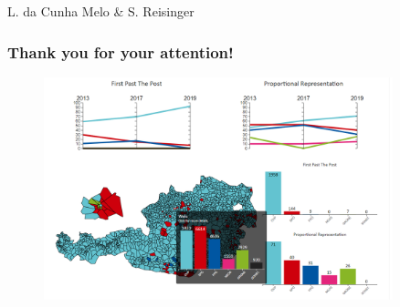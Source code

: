 \documentclass{beamer}
\begin{document}
\begin{frame}
\centerline{L. da Cunha Melo \& S. Reisinger}
\frametitle{Thank you for your attention!}
\begin{figure}
    \centering
    \includegraphics[width=0.9\textwidth]{../Screenshot/screenshot.png}
\end{figure}

\end{frame}

\end{document}
